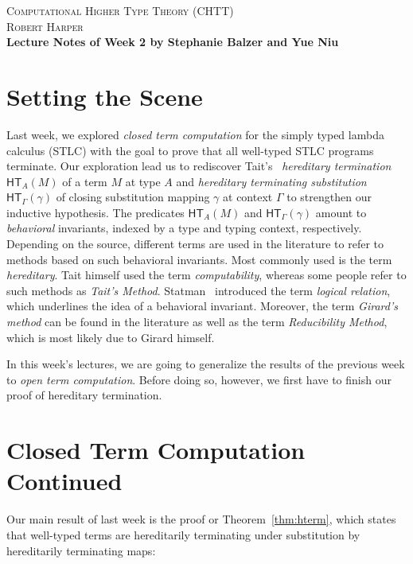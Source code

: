 \documentclass{article}
\newcommand{\hterm}[2]{\ensuremath{\mathsf{HT}_{#1}(#2)}}
\begin{document}
\begin{center}
\Large{\scshape Computational Higher Type Theory (CHTT)}\\[2pt]
\large{\scshape Robert Harper}\\[4pt]
\large\bfseries{Lecture Notes of Week 2 by Stephanie Balzer and Yue Niu}
\end{center}

\bigskip

\section{Setting the Scene}

Last week, we explored \emph{closed term computation} for the simply typed lambda calculus
(STLC) with the goal to prove that all well-typed STLC programs terminate.  Our exploration
lead us to rediscover Tait's~\citeyear{Tait:67} \emph{hereditary termination} $\hterm{A}{M}$ of
a term $M$ at type $A$ and \emph{hereditary terminating substitution} $\hterm{\Gamma}{\gamma}$
of closing substitution mapping $\gamma$ at context $\Gamma$ to strengthen our inductive
hypothesis.  The predicates $\hterm{A}{M}$ and $\hterm{\Gamma}{\gamma}$ amount to
\emph{behavioral} invariants, indexed by a type and typing context, respectively.  Depending on
the source, different terms are used in the literature to refer to methods based on such
behavioral invariants.  Most commonly used is the term \emph{hereditary}.  Tait himself used
the term \emph{computability}, whereas some people refer to such methods as \emph{Tait's
  Method}.  Statman~\citeyear{Statman:85} introduced the term \emph{logical relation}, which
underlines the idea of a behavioral invariant.  Moreover, the term \emph{Girard's method} can
be found in the literature as well as the term \emph{Reducibility Method}, which is most likely
due to Girard himself.

In this week's lectures, we are going to generalize the results of the previous week to
\emph{open term computation}.  Before doing so, however, we first have to finish our proof of
hereditary termination.

\section{Closed Term Computation Continued}

Our main result of last week is the proof or Theorem~\ref{thm:hterm}, which states that well-typed terms are hereditarily terminating under substitution by 
hereditarily terminating maps:
\end{document}
